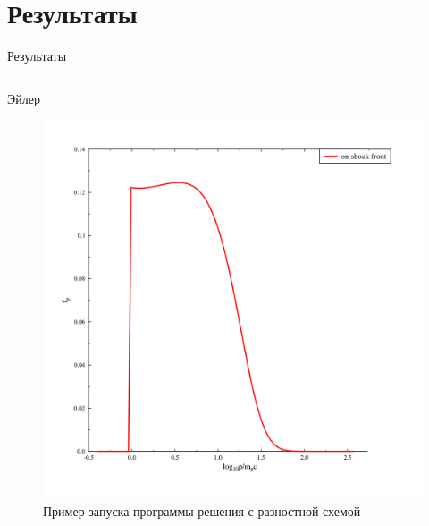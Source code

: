 \documentclass[8pt,pdf,hyperref={unicode},serif]{beamer}
\begin{document}
\section{Результаты}
\begin{frame}{Результаты}
\begin{columns}
\begin{column}{0.5\textwidth}
Эйлер
\begin{figure}[H]
\centering
\includegraphics[width=0.90\linewidth]{r_common}
\caption{Пример запуска программы решения с разностной схемой}
\end{figure}
\end{column}


\end{columns}
\end{frame}
\end{document}
